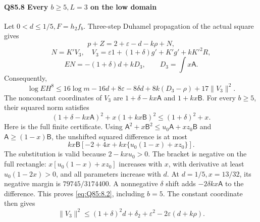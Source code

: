 \paragraph{Q85.8 Every \(b\ge\allowbreak 5,\allowbreak L=\allowbreak 3\) on the low domain}
Let \(0<\allowbreak d\le\allowbreak 1/5,\allowbreak F=\allowbreak h_2f_b\). Three-step Duhamel propagation of the actual square gives
\[
 p+Z=2+\varepsilon-d-k\rho+N,
\]
\[
 N=K'V_3,\quad
 V_3=\varepsilon1+(1+\delta)g'+K'g'+kK'^2R,
\]
\[
 EN=-(1+\delta)d+kD_3,\qquad D_3=\int x\mathsf A.
\]
Consequently,
\[
 \log EH^8\le16\log m-16d+8\varepsilon-8\delta d
                 +8k(D_3-\rho)+17\|V_3\|^2.          \tag{Q85.8.1}\label{eq:Q85:8.1}
\]
The nonconstant coordinates of \(V_3\) are
\(1+\delta-kx\mathsf A\) and \(1+kx\mathsf B\).
For every \(b\ge\allowbreak 5\), their squared norm satisfies
\[
 (1+\delta-kx\mathsf A)^2+x(1+kx\mathsf B)^2
 \le(1+\delta)^2+x.                                 \tag{Q85.8.2}\label{eq:Q85:8.2}
\]
Here is the full finite certificate.
Using \(\mathsf A^2+x\mathsf B^2\le\allowbreak  u_0\mathsf A+xz_0\mathsf B\) and
\(\mathsf A\ge\allowbreak (1-x)\mathsf B\), the unshifted squared difference is at most
\[
 kx\mathsf B[-2+4x+kx\{u_0(1-x)+xz_0\}].
\]
The substitution is valid because \(2-kxu_0>\allowbreak 0\).
The bracket is negative on the full rectangle:
\(x[u_0(1-x)+xz_0]\) increases with \(x\), with derivative at least
\(u_0(1-2x)>\allowbreak 0\), and all parameters increase with \(d\).
At \(d=\allowbreak 1/5,\allowbreak x=\allowbreak 13/32\), its negative margin is \(79745/3174400\).
A nonnegative \(\delta\) shift adds \(-2\delta kx\mathsf A\) to the difference.
This proves \eqref{eq:Q85:8.2}, including \(b=\allowbreak 5\).
The constant coordinate then gives
\[
 \|V_3\|^2\le(1+\delta)^2d+\delta_2
                 +\varepsilon^2-2\varepsilon(d+k\rho).          \tag{Q85.8.3}\label{eq:Q85:8.3}
\]

